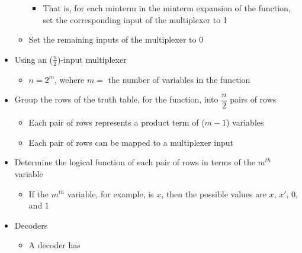 \begin{itemize}
\begin{itemize}
\begin{itemize}
          \item That is, for each minterm in the minterm expansion of the function, set the corresponding input of the multiplexer to 1

        \end{itemize}

      \item Set the remaining inputs of the multiplexer to 0

    \end{itemize}

  \item Using an ($\frac{n}{2}$)-input multiplexer

    \begin{itemize}

      \item $n=2^m$, wehere $m =$ the number of variables in the function

    \end{itemize}

  \item Group the rows of the truth table, for the function, into $\dfrac{n}{2}$ pairs of rows

    \begin{itemize}

      \item Each pair of rows represents a product term of ($m-1$) variables

      \item Each pair of rows can be mapped to a multiplexer input

    \end{itemize}

  \item Determine the logical function of each pair of rows in terms of the $m^{th}$ variable

    \begin{itemize}

      \item If the $m^{th}$ variable, for example, is $x$, then the possible values are $x$, $x'$, 0, and 1

    \end{itemize}

  \item Decoders

    \begin{itemize}

      \item A decoder has


\end{itemize}
\end{itemize}
